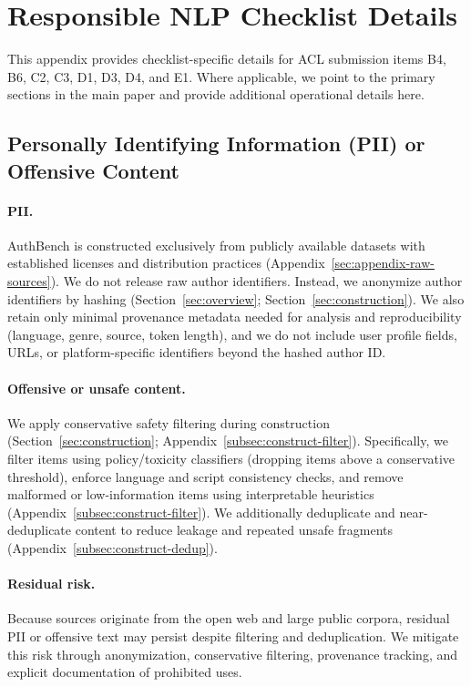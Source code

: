\documentclass[11pt]{article}
\begin{document}
\section{Responsible NLP Checklist Details}
\label{sec:checklist}

This appendix provides checklist-specific details for ACL submission items B4, B6, C2, C3, D1, D3, D4, and E1.
Where applicable, we point to the primary sections in the main paper and provide additional operational details here.

\subsection{Personally Identifying Information (PII) or Offensive Content}
\label{sec:checklist-b4}
\paragraph{PII.}
AuthBench is constructed exclusively from publicly available datasets with established licenses and distribution practices (Appendix~\ref{sec:appendix-raw-sources}).
We do not release raw author identifiers. Instead, we anonymize author identifiers by hashing (Section~\ref{sec:overview}; Section~\ref{sec:construction}).
We also retain only minimal provenance metadata needed for analysis and reproducibility (language, genre, source, token length), and we do not include user profile fields, URLs, or platform-specific identifiers beyond the hashed author ID.

\paragraph{Offensive or unsafe content.}
We apply conservative safety filtering during construction (Section~\ref{sec:construction}; Appendix~\ref{subsec:construct-filter}).
Specifically, we filter items using policy/toxicity classifiers (dropping items above a conservative threshold), enforce language and script consistency checks, and remove malformed or low-information items using interpretable heuristics (Appendix~\ref{subsec:construct-filter}).
We additionally deduplicate and near-deduplicate content to reduce leakage and repeated unsafe fragments (Appendix~\ref{subsec:construct-dedup}).

\paragraph{Residual risk.}
Because sources originate from the open web and large public corpora, residual PII or offensive text may persist despite filtering and deduplication.
We mitigate this risk through anonymization, conservative filtering, provenance tracking, and explicit documentation of prohibited uses.
\end{document}
